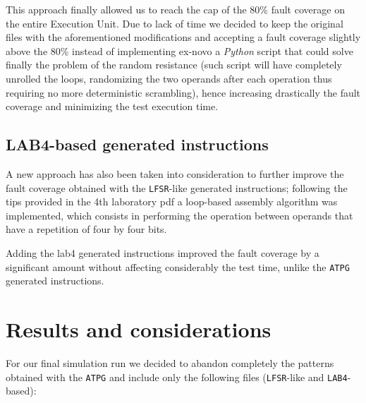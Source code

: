 \documentclass{article}
\begin{document}
This approach finally allowed us to reach the cap of the 80\% fault coverage on the entire Execution Unit.
Due to lack of time we decided to keep the original files with the aforementioned modifications and accepting a fault coverage slightly above the 80\% instead of implementing ex-novo a \emph{Python} script that could solve finally the problem of the random resistance (such script will have completely unrolled the loops, randomizing the two operands after each operation thus requiring no more deterministic scrambling), hence increasing drastically the fault coverage and minimizing the test execution time.


%
%

\subsection{LAB4-based generated instructions}
A new approach has also been taken into consideration to further improve the fault coverage obtained with the \texttt{LFSR}-like generated instructions; following the tips provided in the 4th laboratory pdf a loop-based assembly algorithm was implemented, which consists in performing the operation between operands that have a repetition of four by four bits.

Adding the lab4 generated instructions improved the fault coverage by a significant amount without affecting considerably the test time, unlike the \texttt{ATPG} generated instructions.

%
%

\section{Results and considerations}

For our final simulation run we decided to abandon completely the patterns obtained with the \texttt{ATPG} and include only the following files (\texttt{LFSR}-like and \texttt{LAB4}-based):
\end{document}
